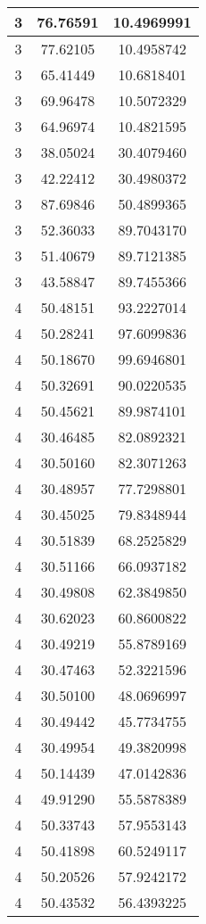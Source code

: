 \documentclass[
]{book}
\begin{document}
\begin{tabular}{c|c|c}
\hline
3 & 76.76591 & 10.4969991\\
\hline
3 & 77.62105 & 10.4958742\\
\hline
3 & 65.41449 & 10.6818401\\
\hline
3 & 69.96478 & 10.5072329\\
\hline
3 & 64.96974 & 10.4821595\\
\hline
3 & 38.05024 & 30.4079460\\
\hline
3 & 42.22412 & 30.4980372\\
\hline
3 & 87.69846 & 50.4899365\\
\hline
3 & 52.36033 & 89.7043170\\
\hline
3 & 51.40679 & 89.7121385\\
\hline
3 & 43.58847 & 89.7455366\\
\hline
4 & 50.48151 & 93.2227014\\
\hline
4 & 50.28241 & 97.6099836\\
\hline
4 & 50.18670 & 99.6946801\\
\hline
4 & 50.32691 & 90.0220535\\
\hline
4 & 50.45621 & 89.9874101\\
\hline
4 & 30.46485 & 82.0892321\\
\hline
4 & 30.50160 & 82.3071263\\
\hline
4 & 30.48957 & 77.7298801\\
\hline
4 & 30.45025 & 79.8348944\\
\hline
4 & 30.51839 & 68.2525829\\
\hline
4 & 30.51166 & 66.0937182\\
\hline
4 & 30.49808 & 62.3849850\\
\hline
4 & 30.62023 & 60.8600822\\
\hline
4 & 30.49219 & 55.8789169\\
\hline
4 & 30.47463 & 52.3221596\\
\hline
4 & 30.50100 & 48.0696997\\
\hline
4 & 30.49442 & 45.7734755\\
\hline
4 & 30.49954 & 49.3820998\\
\hline
4 & 50.14439 & 47.0142836\\
\hline
4 & 49.91290 & 55.5878389\\
\hline
4 & 50.33743 & 57.9553143\\
\hline
4 & 50.41898 & 60.5249117\\
\hline
4 & 50.20526 & 57.9242172\\
\hline
4 & 50.43532 & 56.4393225\\

\end{tabular}
\end{document}
